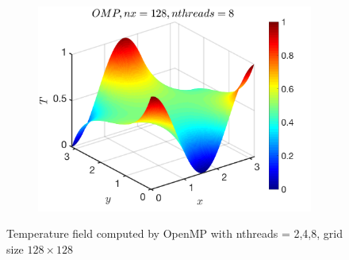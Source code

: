 \documentclass[a4paper]{article}
\begin{document}
\begin{figure}[H]
\begin{subfigure}[b]{0.32\textwidth}
            \includegraphics[width=\textwidth]{./Figure/heat_omp_nx128_nth8.png} 
        \end{subfigure}
        \caption{Temperature field computed by OpenMP with nthreads = 2,4,8, grid size $128\times128$}
    \end{figure}
    
\end{document}
